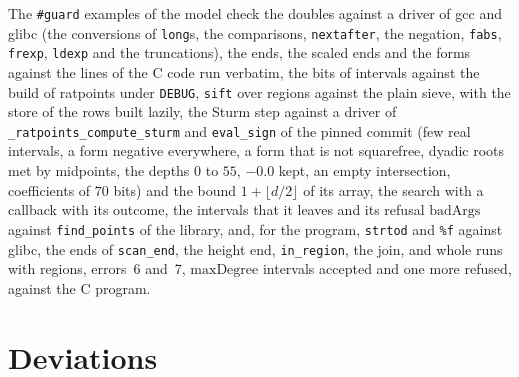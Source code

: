 The \verb|#guard| examples of the model check the doubles against a driver of gcc and glibc (the
conversions of \verb|long|s, the comparisons, \verb|nextafter|, the negation, \verb|fabs|,
\verb|frexp|, \verb|ldexp| and the truncations), the ends, the scaled ends and the forms against the
lines of the C code run verbatim, the bits of intervals against the build of ratpoints under
\verb|DEBUG|, \verb|sift| over regions against the plain sieve, with the store of the rows built
lazily, the Sturm step against a driver of \verb|_ratpoints_compute_sturm| and \verb|eval_sign| of
the pinned commit (few real intervals, a form negative everywhere, a form that is not squarefree,
dyadic roots met by midpoints, the depths $0$ to $55$, $-0.0$ kept, an empty intersection,
coefficients of $70$ bits) and the bound $1 + \lfloor d/2 \rfloor$ of its array, the search with a
callback with its outcome, the intervals that it leaves and its refusal $\mathrm{badArgs}$ against
\verb|find_points| of the library, and, for the program, \verb|strtod| and \verb|%f| against glibc,
the ends of \verb|scan_end|, the height end, \verb|in_region|, the join, and whole runs with
regions, errors~6 and~7, $\mathrm{maxDegree}$ intervals accepted and one more refused, against the C
program.

\section{Deviations}\label{sec:regionDeviations}

